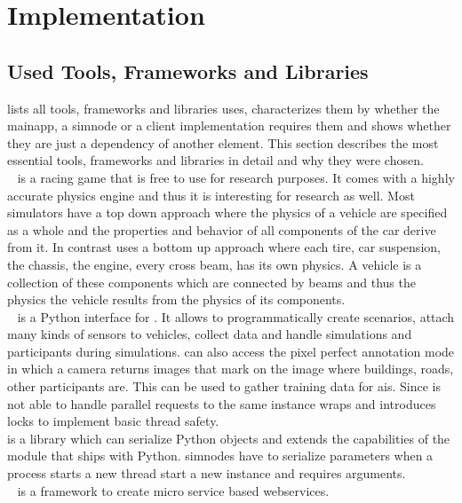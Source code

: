 \section{Implementation}\label{sec:implementation}
\subsection{Used Tools, Frameworks and Libraries}
 lists all tools, frameworks and libraries \drivebuild{} uses, characterizes them by whether the \gls{mainapp}, a \gls{simnode} or a client implementation requires them and shows whether they are just a dependency of another element.
This section describes the most essential tools, frameworks and libraries in detail and why they were chosen.\\
\beamng{}~\cite{beamNG} is a racing game that is free to use for research purposes.
It comes with a highly accurate physics engine and thus it is interesting for research as well.
Most simulators have a top down approach where the physics of a vehicle are specified as a whole and the properties and behavior of all components of the car derive from it.
In contrast \beamng{} uses a bottom up approach where each tire, car suspension, the chassis, the engine, every cross beam, \etc{} has its own physics.
A vehicle is a collection of these components which are connected by beams and thus the physics the vehicle results from the physics of its components.\\
\beamngpy{}~\cite{beamngpy} is a Python interface for \beamng{}.
It allows to programmatically create scenarios, attach many kinds of sensors to vehicles, collect data and handle simulations and participants during simulations.
\beamngpy{} can also access the pixel perfect annotation mode in which a camera returns images that mark on the image where buildings, roads, other participants \etc{} are.
This can be used to gather training data for \glspl{ai}.
Since \beamngpy{} is not able to handle parallel requests to the same \beamng{} instance \drivebuild{} wraps \beamngpy{} and introduces locks to implement basic thread safety.\\
\dill{} is a library which can serialize Python objects and extends the capabilities of the \pickle{} module that ships with Python.
\glspl{simnode} have to serialize parameters when a process starts a new thread \eg{} start a new \beamng{} instance and requires arguments.\\
\flask{}~\cite{flask} is a framework to create micro service based webservices.
